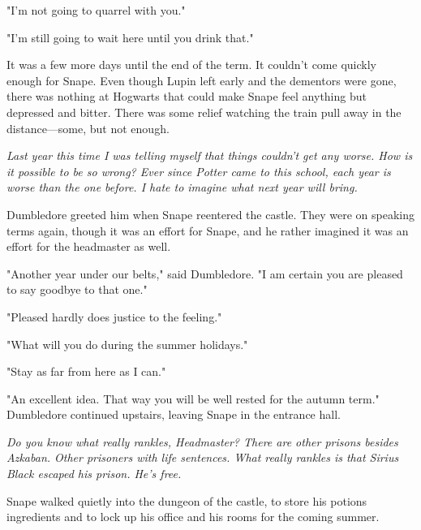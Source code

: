 "I'm not going to quarrel with you."

"I'm still going to wait here until you drink that."

\sbreak

It was a few more days until the end of the term. It couldn't come quickly enough for Snape. Even though Lupin left early and the dementors were gone, there was nothing at Hogwarts that could make Snape feel anything but depressed and bitter. There was some relief watching the train pull away in the distance—some, but not enough.

\emph{Last year this time I was telling myself that things couldn't get any worse. How is it possible to be so wrong? Ever since Potter came to this school, each year is worse than the one before. I hate to imagine what next year will bring.}

Dumbledore greeted him when Snape reentered the castle. They were on speaking terms again, though it was an effort for Snape, and he rather imagined it was an effort for the headmaster as well.

"Another year under our belts," said Dumbledore. "I am certain you are pleased to say goodbye to that one."

"Pleased hardly does justice to the feeling."

"What will you do during the summer holidays."

"Stay as far from here as I can."

"An excellent idea. That way you will be well rested for the autumn term." Dumbledore continued upstairs, leaving Snape in the entrance hall.

\emph{Do you know what really rankles, Headmaster? There are other prisons besides Azkaban. Other prisoners with life sentences. What really rankles is that Sirius Black escaped his prison. He's free.}

Snape walked quietly into the dungeon of the castle, to store his potions ingredients and to lock up his office and his rooms for the coming summer.

\sbreak 


